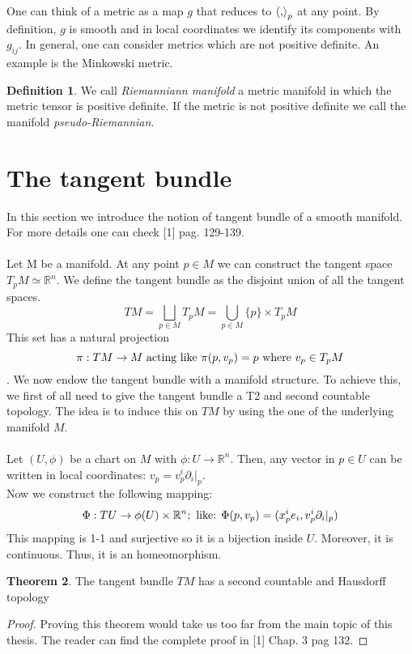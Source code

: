 \documentclass[12pt,a4paper]{report}
\theoremstyle{definition}
\newtheorem{Def}{Definition}[chapter]
\theoremstyle{Theorem}
\newtheorem{Theo}[Def]{Theorem}
\theoremstyle{definition}
\theoremstyle{definition}
\begin{document}
	One can think of a metric as a map $g$ that reduces to $\braket{,}_p$ at any point. By definition, $g$ is smooth and in local coordinates we identify its components with $g_{ij}$.
	In general, one can consider metrics which are not positive definite. An example is the Minkowski metric.
	\begin{Def}
		We call \textit{Riemanniann manifold} a metric manifold in which the metric tensor is positive definite. If the metric is not positive definite we call the manifold \textit{pseudo-Riemannian}.
	\end{Def}
	\section{The tangent bundle}
	In this section we introduce the notion of tangent bundle of a smooth manifold. For more details one can check [1] pag. 129-139.\\
	\\
	Let M be a manifold. At any point $p\in M$ we can construct the tangent space $T_pM\simeq \mathbb{R}^n$. We define the tangent bundle as the disjoint union of all the tangent spaces.
	$$TM=\bigsqcup_{p\in M}T_pM=\bigcup_{p\in M} \{p\}\times T_pM$$
	This set has a natural projection 
	$$\pi:TM\rightarrow M\hbox{ acting like }\pi(p,v_p)=p \hbox{ where }v_p\in T_pM$$.  
	We now endow the tangent bundle with a manifold structure. To achieve this, we first of all need to give the tangent bundle a T2 and second countable topology. The idea is to induce this on $TM$ by using the one of the underlying manifold $M$.\\
	\\
	Let $(U,\phi)$ be a chart on $M$ with $\phi:U\rightarrow \mathbb{R}^n$. Then, any vector in $p\in U$ can be written in local coordinates: $v_p=v^i_p\partial_i|_p$.\\
	Now we construct the following mapping:
	$$\Phi:TU\rightarrow \phi(U)\times \mathbb{R}^n; \hbox{ like: }
	\Phi(p,v_p)=(x^i_pe_i,v^i_p\partial_i|_p)$$
	This mapping is 1-1 and surjective so it is a bijection inside $U$. Moreover, it is continuous. Thus, it is an homeomorphism.
	\begin{Theo} \label{Theo_1.1}
		The tangent bundle $TM$ has a second countable and Hausdorff topology
	\end{Theo}
	\begin{proof}
		Proving this theorem would take us too far from the main topic of this thesis. The reader can find the complete proof in [1] Chap. 3 pag 132.
	\end{proof}
\end{document}
